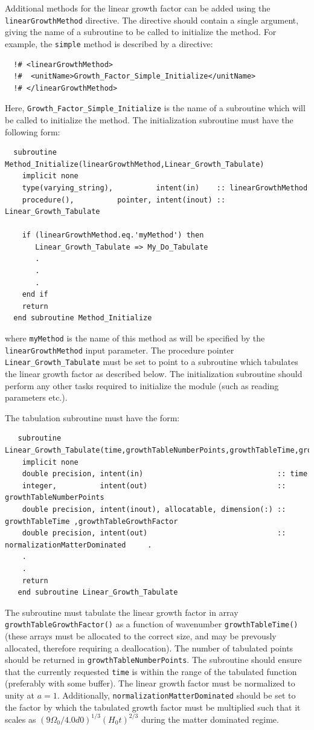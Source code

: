 Additional methods for the linear growth factor can be added using the {\tt linearGrowthMethod} directive. The directive should contain a single argument, giving the name of a subroutine to be called to initialize the method. For example, the {\tt simple} method is described by a directive:
\begin{verbatim}
  !# <linearGrowthMethod>
  !#  <unitName>Growth_Factor_Simple_Initialize</unitName>
  !# </linearGrowthMethod>
\end{verbatim}
Here, {\tt Growth\_Factor\_Simple\_Initialize} is the name of a subroutine which will be called to initialize the method. The initialization subroutine must have the following form:
\begin{verbatim}
  subroutine Method_Initialize(linearGrowthMethod,Linear_Growth_Tabulate)
    implicit none
    type(varying_string),          intent(in)    :: linearGrowthMethod
    procedure(),          pointer, intent(inout) :: Linear_Growth_Tabulate
    
    if (linearGrowthMethod.eq.'myMethod') then
       Linear_Growth_Tabulate => My_Do_Tabulate
       .
       .
       .
    end if
    return
  end subroutine Method_Initialize
\end{verbatim}
where {\tt myMethod} is the name of this method as will be specified by the {\tt linearGrowthMethod} input parameter. The procedure pointer {\tt Linear\_Growth\_Tabulate} must be set to point to a subroutine which tabulates the linear growth factor as described below. The initialization subroutine should perform any other tasks required to initialize the module (such as reading parameters etc.).

The tabulation subroutine must have the form:
\begin{verbatim}
   subroutine Linear_Growth_Tabulate(time,growthTableNumberPoints,growthTableTime,growthTableGrowthFactor,normalizationMatterDominated)
    implicit none
    double precision, intent(in)                               :: time
    integer,          intent(out)                              :: growthTableNumberPoints
    double precision, intent(inout), allocatable, dimension(:) :: growthTableTime ,growthTableGrowthFactor
    double precision, intent(out)                              :: normalizationMatterDominated     .
    .
    .
    return
   end subroutine Linear_Growth_Tabulate
\end{verbatim}
The subroutine must tabulate the linear growth factor in array {\tt growthTableGrowthFactor()} as a function of wavenumber {\tt growthTableTime()} (these arrays must be allocated to the correct size, and may be prevously allocated, therefore requiring a deallocation). The number of tabulated points should be returned in {\tt growthTableNumberPoints}. The subroutine should ensure that the currently requested {\tt time} is within the range of the tabulated function (preferably with some buffer). The linear growth factor must be normalized to unity at $a=1$. Additionally, {\tt normalizationMatterDominated} should be set to the factor by which the tabulated growth factor must be multiplied such that it scales as $(9 \Omega_0 / 4.0d0)^{1/3} (H_0 t)^{2/3}$ during the matter dominated regime.

